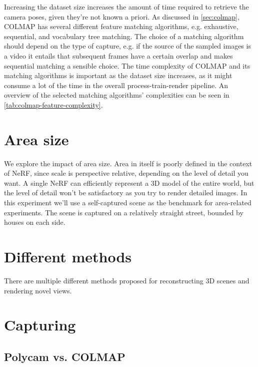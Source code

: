 

Increasing the dataset size increases the amount of time required to retrieve the camera poses, given they're not known a priori. As discussed in \autoref{sec:colmap}, COLMAP has several different feature matching algorithms, e.g. exhaustive, sequential, and vocabulary tree matching. The choice of a matching algorithm should depend on the type of capture, e.g. if the source of the sampled images is a video it entails that subsequent frames have a certain overlap and makes sequential matching a sensible choice. The time complexity of COLMAP and its matching algorithms is important as the dataset size increases, as it might consume a lot of the time in the overall process-train-render pipeline. An overview of the selected matching algorithms' complexities can be seen in \autoref{tab:colmap-feature-complexity}.

\section{Area size}
We explore the impact of area size. Area in itself is poorly defined in the context of NeRF, since scale is perspective relative, depending on the level of detail you want. A single NeRF can efficiently represent a 3D model of the entire world, but the level of detail won't be satisfactory as you try to render detailed images. In this experiment we'll use a self-captured scene as the benchmark for area-related experiments. The scene \cite{data:streetview} is captured on a relatively straight street, bounded by houses on each side. 



\section{Different methods}
There are multiple different methods proposed for reconstructing 3D scenes and rendering novel views.






\section{Capturing}
\subsection{Polycam vs. COLMAP}

